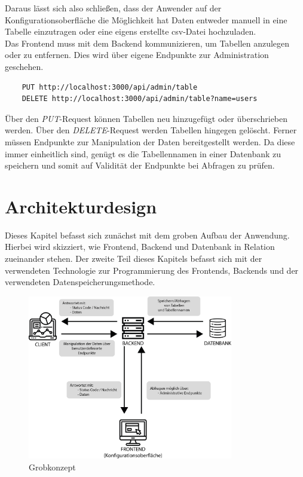 Daraus lässt sich also schließen, dass der Anwender auf der Konfigurationsoberfläche die Möglichkeit hat Daten entweder manuell in eine Tabelle einzutragen oder eine eigens erstellte \gls{csv}-Datei hochzuladen.
\\
Das Frontend muss mit dem Backend kommunizieren, um Tabellen anzulegen oder zu entfernen. Dies wird über eigene Endpunkte zur Administration geschehen. 

\begin{verbatim}
    PUT http://localhost:3000/api/admin/table
    DELETE http://localhost:3000/api/admin/table?name=users
\end{verbatim}

Über den \textit{PUT}-Request können Tabellen neu hinzugefügt oder überschrieben werden. Über den \textit{DELETE}-Request werden Tabellen hingegen gelöscht.
Ferner müssen Endpunkte zur Manipulation der Daten bereitgestellt werden. Da diese immer einheitlich sind, genügt es die Tabellennamen in einer Datenbank zu speichern und somit auf Validität der Endpunkte bei Abfragen zu prüfen.

\section{Architekturdesign} \label{sec:architecture}
Dieses Kapitel befasst sich zunächst mit dem groben Aufbau der Anwendung. Hierbei wird skizziert, wie Frontend, Backend und Datenbank in Relation zueinander stehen. Der zweite Teil dieses Kapitels befasst sich mit der verwendeten Technologie zur Programmierung des Frontends, Backends und der verwendeten Datenspeicherungsmethode.  

\begin{figure}[h]
    \centering
    \includegraphics[width=0.8\textwidth]{figures/grobkonzept.png}
    \caption{Grobkonzept}
    \label{fig:grobkonzept}
\end{figure}

